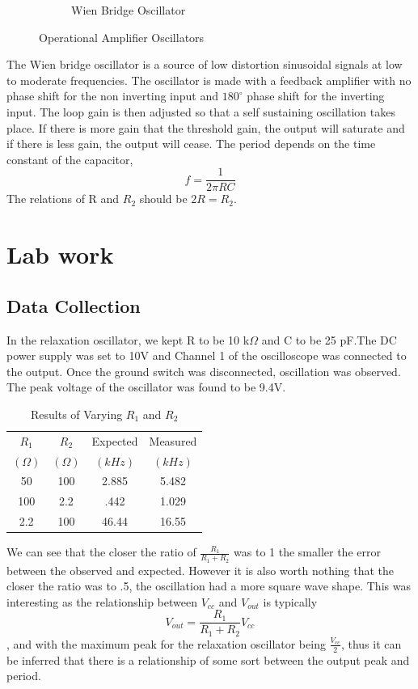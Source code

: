 \documentclass[11pt,letterpaper,onecolumn]{article}
\begin{document}
\begin{figure}[H]
\begin{subfigure}{.5\textwidth}
  \caption{Wien Bridge Oscillator}
  \label{fig:sub2}
\end{subfigure}
\caption{Operational Amplifier Oscillators}
\label{fig:test}
\end{figure}

The Wien bridge oscillator is a source of low distortion sinusoidal signals at low to moderate frequencies. The oscillator is made with a feedback amplifier with no phase shift for the non inverting input and $180^{\circ}$ phase shift for the inverting input. The loop gain is then adjusted so that a self sustaining oscillation takes place. If there is more gain that the threshold gain, the output will saturate and if there is less gain, the output will cease. The period depends on the time constant of the capacitor,
$$f=\frac{1}{2\pi RC}$$
The relations of R and $R_2$ should be $2R=R_2$.

\section{Lab work}

\subsection{Data Collection}

In the relaxation oscillator, we kept R to be 10 k$\Omega$ and C to be 25 pF.The DC power supply was set to 10V and Channel 1 of the oscilloscope was connected to the output. Once the ground switch was disconnected, oscillation was observed. The peak voltage of the oscillator was found to be 9.4V. 

\begin{table}[H]
\centering
\begin{tabular}{|c|c|c|c|}
 \hline
 $R_1$ & $R_2$ & Expected & Measured \\
 $\left(\Omega \right)$ & $\left(\Omega \right)$ & $\left(kHz\right)$ & $\left(kHz\right)$ \\\hline
 50 & 100 & 2.885 & 5.482\\
 100 & 2.2 & .442 & 1.029\\
 2.2 & 100 & 46.44 & 16.55\\\hline

\end{tabular}
\caption{Results of Varying $R_1$ and $R_2$}
\label{tab:data1}
\end{table}

We can see that the closer the ratio of $\frac{R_1}{R_1 + R_2}$ was to 1 the smaller the error between the observed and expected. However it is also worth nothing that the closer the ratio was to .5, the oscillation had a more square wave shape. This was interesting as the relationship between $V_{cc}$ and $V_{out}$ is typically 
$$V_{out} = \frac{R_1}{R_1 + R_2}V_{cc}$$,
and with the maximum peak for the relaxation oscillator being $\frac{V_{cc}}{2}$, thus it can be inferred that there is a relationship of some sort between the output peak and period.
\end{document}
